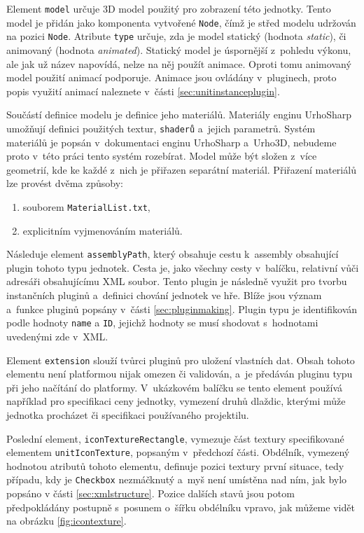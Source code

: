 Element \texttt{model} určuje 3D model použitý pro zobrazení této jednotky. Tento model je přidán jako komponenta vytvořené \texttt{Node}, čímž je střed modelu udržován na pozici \texttt{Node}. Atribute \texttt{type} určuje, zda je model statický (hodnota \textit{static}), či animovaný (hodnota \textit{animated}). Statický model je úspornější z~pohledu výkonu, ale jak už název napovídá, nelze na něj použít animace. Oproti tomu animovaný model použití animací podporuje. Animace jsou ovládány v~pluginech, proto popis využití animací naleznete v~části \ref{sec:unitinstanceplugin}.

Součástí definice modelu je definice jeho materiálů. Materiály enginu UrhoSharp umožňují definici použitých textur, \texttt{shaderů} a~jejich parametrů. Systém materiálů je popsán v~dokumentaci enginu UrhoSharp a~Urho3D, nebudeme proto v~této práci tento systém rozebírat. Model může být složen z~více geometrií, kde ke každé z~nich je přiřazen separátní materiál. Přiřazení materiálů lze provést dvěma způsoby:

\begin{enumerate}
	\item souborem \texttt{MaterialList.txt},
	\item explicitním vyjmenováním materiálů.
\end{enumerate}

Následuje element \texttt{assemblyPath}, který obsahuje cestu k~assembly obsahující plugin tohoto typu jednotek. Cesta je, jako všechny cesty v~balíčku, relativní vůči adresáři obsahujícímu XML soubor. Tento plugin je následně využit pro tvorbu instančních pluginů a~definici chování jednotek ve hře. Blíže jsou význam a~funkce pluginů popsány v~části \ref{sec:pluginmaking}. Plugin typu je identifikován podle hodnoty \texttt{name} a \texttt{ID}, jejichž hodnoty se musí shodovat s~hodnotami uvedenými zde v~XML. 

Element \texttt{extension} slouží tvůrci pluginů pro uložení vlastních dat. Obsah tohoto elementu není platformou nijak omezen či validován, a~je předáván pluginu typu při jeho načítání do platformy. V~ukázkovém balíčku se tento element používá například pro specifikaci ceny jednotky, vymezení druhů dlaždic, kterými může jednotka procházet či specifikaci používaného projektilu.

Poslední element, \texttt{iconTextureRectangle}, vymezuje část textury specifikované elementem \texttt{unitIconTexture}, popsaným v~předchozí části. Obdélník, vymezený hodnotou atributů tohoto elementu, definuje pozici textury první situace, tedy případu, kdy je \texttt{Checkbox} nezmáčknutý a~myš není umístěna nad ním, jak bylo popsáno v části \ref{sec:xmlstructure}. Pozice dalších stavů jsou potom předpokládány postupně s~posunem o~šířku obdélníku vpravo, jak můžeme vidět na obrázku \ref{fig:icontexture}.


